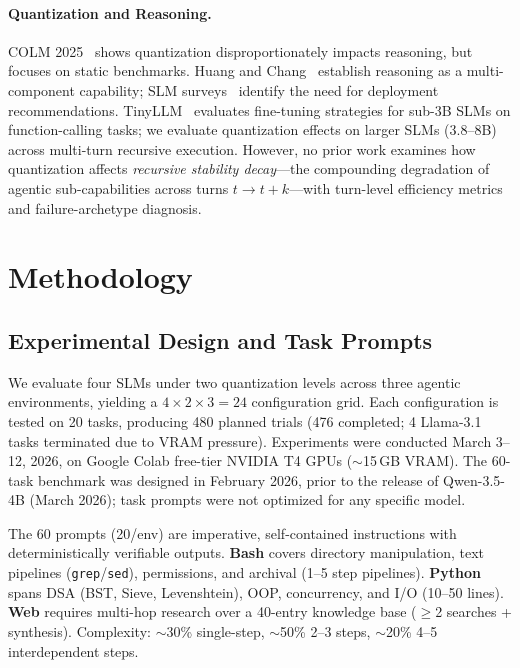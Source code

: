 \documentclass{article}
\begin{document}
\paragraph{Quantization and Reasoning.}
COLM 2025~\cite{colm2025quantization} shows quantization disproportionately impacts reasoning, but focuses on static benchmarks. Huang and Chang~\cite{huang2023reasoning} establish reasoning as a multi-component capability; SLM surveys~\cite{slm2025survey} identify the need for deployment recommendations. TinyLLM~\cite{tinyllm2025} evaluates fine-tuning strategies for sub-3B SLMs on function-calling tasks; we evaluate quantization effects on larger SLMs (3.8--8B) across multi-turn recursive execution. However, no prior work examines how quantization affects \emph{recursive stability decay}---the compounding degradation of agentic sub-capabilities across turns $t \rightarrow t{+}k$---with turn-level efficiency metrics and failure-archetype diagnosis.

\section{Methodology}

\subsection{Experimental Design and Task Prompts}

We evaluate four SLMs under two quantization levels across three agentic environments, yielding a $4 \times 2 \times 3 = 24$ configuration grid. Each configuration is tested on 20 tasks, producing 480 planned trials (476 completed; 4 Llama-3.1 tasks terminated due to VRAM pressure). Experiments were conducted March 3--12, 2026, on Google Colab free-tier NVIDIA T4 GPUs ($\sim$15\,GB VRAM). The 60-task benchmark was designed in February 2026, prior to the release of Qwen-3.5-4B (March 2026); task prompts were not optimized for any specific model.

The 60 prompts (20/env) are imperative, self-contained instructions with deterministically verifiable outputs. \textbf{Bash} covers directory manipulation, text pipelines (\texttt{grep}/\texttt{sed}), permissions, and archival (1--5 step pipelines). \textbf{Python} spans DSA (BST, Sieve, Levenshtein), OOP, concurrency, and I/O (10--50 lines). \textbf{Web} requires multi-hop research over a 40-entry knowledge base ($\geq$2 searches + synthesis). Complexity: $\sim$30\% single-step, $\sim$50\% 2--3 steps, $\sim$20\% 4--5 interdependent steps.
\end{document}
